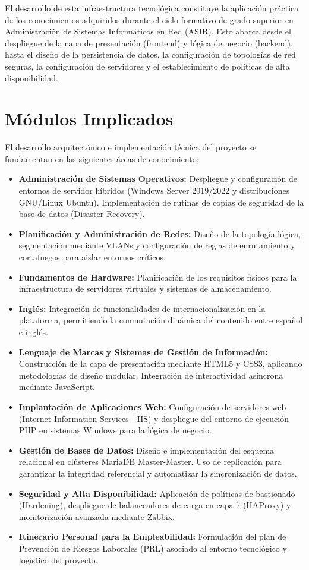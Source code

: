 \documentclass[12pt,a4paper]{article}
\begin{document}
El desarrollo de esta infraestructura tecnológica constituye la aplicación práctica de los conocimientos adquiridos durante el ciclo formativo de grado superior en Administración de Sistemas Informáticos en Red (ASIR). Esto abarca desde el despliegue de la capa de presentación (frontend) y lógica de negocio (backend), hasta el diseño de la persistencia de datos, la configuración de topologías de red seguras, la configuración de servidores y el establecimiento de políticas de alta disponibilidad.

\newpage
\section{Módulos Implicados}
\label{Modulos}

El desarrollo arquitectónico e implementación técnica del proyecto se fundamentan en las siguientes áreas de conocimiento:

\begin{itemize}
    \item \textbf{Administración de Sistemas Operativos:} Despliegue y configuración de entornos de servidor híbridos (Windows Server 2019/2022 y distribuciones GNU/Linux Ubuntu). Implementación de rutinas de copias de seguridad de la base de datos (Disaster Recovery).
    \item \textbf{Planificación y Administración de Redes:} Diseño de la topología lógica, segmentación mediante VLANs y configuración de reglas de enrutamiento y cortafuegos para aislar entornos críticos.
    \item \textbf{Fundamentos de Hardware:} Planificación de los requisitos físicos para la infraestructura de servidores virtuales y sistemas de almacenamiento.
    \item \textbf{Inglés:} Integración de funcionalidades de internacionalización en la plataforma, permitiendo la conmutación dinámica del contenido entre español e inglés.
    \item \textbf{Lenguaje de Marcas y Sistemas de Gestión de Información:} Construcción de la capa de presentación mediante HTML5 y CSS3, aplicando metodologías de diseño modular. Integración de interactividad asíncrona mediante JavaScript.
    \item \textbf{Implantación de Aplicaciones Web:} Configuración de servidores web (Internet Information Services - IIS) y despliegue del entorno de ejecución PHP en sistemas Windows para la lógica de negocio.
    \item \textbf{Gestión de Bases de Datos:} Diseño e implementación del esquema relacional en clústeres MariaDB Master-Master. Uso de replicación para garantizar la integridad referencial y automatizar la sincronización de datos.
    \item \textbf{Seguridad y Alta Disponibilidad:} Aplicación de políticas de bastionado (Hardening), despliegue de balanceadores de carga en capa 7 (HAProxy) y monitorización avanzada mediante Zabbix.
    \item \textbf{Itinerario Personal para la Empleabilidad:} Formulación del plan de Prevención de Riesgos Laborales (PRL) asociado al entorno tecnológico y logístico del proyecto.
\end{itemize}
\end{document}

